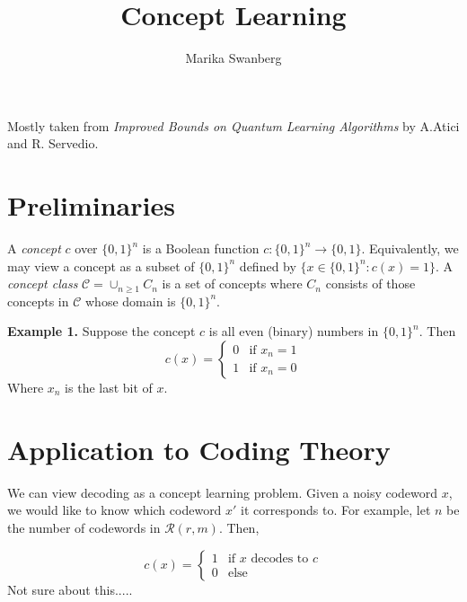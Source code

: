 \documentclass[12pt]{article}
\author{Marika Swanberg}
\title{Concept Learning}
\date{}
\begin{document}
\maketitle
Mostly taken from \textit{Improved Bounds on Quantum Learning Algorithms} by A.Atici and R. Servedio.

\section{Preliminaries}
A \textit{concept} $c$ over $\{0,1\}^n$ is a Boolean function $c:\{0,1\}^n \rightarrow \{0,1\}$. Equivalently, we may view a concept as a subset of $\{0,1\}^n$ defined by $\{x\in \{0,1\}^n : c(x) = 1\}$. A \textit{concept class} $\mathcal{C} = \cup_{n\geq 1}C_n$ is a set of concepts where $C_n$ consists of those concepts in $\mathcal{C}$ whose domain is $\{0,1\}^n$.

\bigskip

\textbf{Example 1.} Suppose the concept $c$ is all even (binary) numbers in $\{0,1\}^n$. Then
\[
c(x) =
  \begin{cases}
                                   0 & \text{if $x_n = 1$} \\
                                   1 & \text{if $x_n = 0$}
  \end{cases}
\]
Where $x_n$ is the last bit of $x$.

\section{Application to Coding Theory}
We can view decoding as a concept learning problem. Given a noisy codeword $x$, we would like to know which codeword $x'$ it corresponds to. For example, let $n$ be the number of codewords in $\mathscr{R}(r,m)$. Then, 

\[
c(x) =
  \begin{cases}
                                   1 & \text{if $x$ decodes to $c$} \\
                                   0 & \text{else }
  \end{cases}
\]
Not sure about this.....
\end{document}
